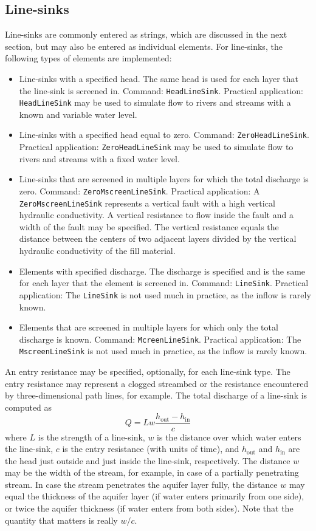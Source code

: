 \documentclass [10pt,letterpaper] {article}
\begin{document}
\subsection{Line-sinks}
Line-sinks are commonly entered as strings, which are discussed in the next section, but may also be entered as individual elements. 
For line-sinks, the following types of elements are implemented:
\begin{itemize}
\item 
Line-sinks with a specified head. The same head is used for each layer that the line-sink is screened in. Command: {\tt HeadLineSink}. Practical application: {\tt HeadLineSink} may be used to simulate flow to rivers and streams with a known and variable water level.
\item 
Line-sinks with a specified head equal to zero. Command: {\tt ZeroHeadLineSink}. Practical application: {\tt ZeroHeadLineSink} may be used to simulate flow to rivers and streams with a fixed water level.
\item Line-sinks that are screened in multiple layers for which the total discharge is zero. Command:  {\tt ZeroMscreenLineSink}.  Practical application: A {\tt ZeroMscreenLineSink} represents a vertical fault with a high vertical hydraulic conductivity. A vertical resistance to flow inside the fault and a width of the fault may be specified. The vertical resistance equals the distance between the centers of two adjacent layers divided by the vertical hydraulic conductivity of the fill material.
\item Elements with specified discharge. The discharge is specified and is the same for each layer that the element is screened in. Command: {\tt LineSink}. Practical application: The {\tt LineSink} is not used much in practice, as the inflow is rarely known.
\item Elements that are screened in multiple layers for which only the total discharge is known. Command: {\tt McreenLineSink}. Practical application: The {\tt MscreenLineSink} is not used much in practice, as the inflow is rarely known.
\end{itemize}

An entry resistance may be specified, optionally, for each line-sink type. 
The entry resistance may represent a clogged streambed or the resistance encountered by three-dimensional path lines, for example. The total discharge of a line-sink is computed as
\begin{equation}\label{Qls}
Q = Lw \frac{h_\text{out}-h_\text{in}}{c}
\end{equation}
where $L$ is the strength of a line-sink, $w$ is the distance over which water enters the line-sink, $c$ is the entry resistance (with units of time), and $h_\text{out}$ and $h_\text{in}$ are the head just outside and just inside the line-sink, respectively. The distance $w$ may be the width of the stream, for example, in case of a partially penetrating stream. In case the stream penetrates the aquifer layer fully, the distance $w$ may equal the thickness of the aquifer layer (if water enters primarily from one side), or twice the aquifer thickness (if water enters from both sides). Note that the quantity that matters is really $w/c$. 
\end{document}
